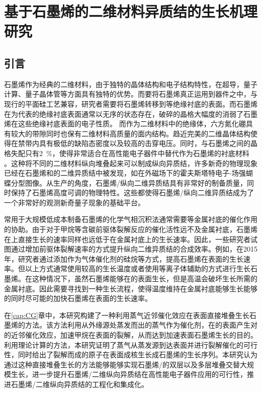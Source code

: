 \chapter{基于石墨烯的二维材料异质结的生长机理研究}
\section{引言}
石墨烯作为经典的二维材料，由于独特的晶体结构和电子结构特性，在超导，量子计算、量子晶体管等方面具有独特的优势。而要将石墨烯真正运用到器件之中，与现行的平面硅工艺兼容，研究者需要将石墨烯转移到等绝缘衬底的表面。而石墨烯在为代表的绝缘衬底表面通常以无序的状态存在，破碎的晶格大幅度的消弱了石墨烯在这些绝缘衬底表面的电子性质。
而作为二维材料中的绝缘体，六方氮化硼具有较大的带隙同时也保有二维材料高质量的面内结构。趋近完美的二维晶体结构使得在禁带内具有极低的缺陷态密度以及较高的击穿电压。同时，与石墨烯之间的晶格失配只有\SI{2}{\percent}，使得非常适合在高性能电子器件中替代作为石墨烯的衬底材料 。这种将不同的二维材料纵向堆叠起来可以制成纵向异质结，许多新奇的物理现象已经在石墨烯和的二维异质结中被发现，如在外磁场下的霍夫斯塔特电子-场强蝴蝶分型图像。从生产的角度，石墨烯/纵向二维异质结具有非常好的制备质量，同时保持了石墨烯高度可调的物理特性。这些都使得石墨烯/纵向二维异质结成为了一个非常好的观测新奇量子现象的基础平台。

常用于大规模低成本制备石墨烯的化学气相沉积法通常需要等金属衬底的催化作用的协助。由于对于甲烷等含碳前驱体裂解反应的催化活性远不及金属衬底，石墨烯在上直接生长的速率同样也远低于在金属衬底上的生长速率。因此，一些研究者试图通过增加前驱体裂解速率的方式提升纵向二维异质结的合成效率。例如，在2015年，研究者通过添加作为气体催化剂的硅烷等方式，提高石墨烯在表面的生长速率。但以上方式通常使用较高的生长温度或者使用等离子体辅助的方式进行生长石墨烯。在这种情况下，虽然石墨烯能够在的表面生长，但是高温会破坏生长所需的金属衬底。因此需要寻找到一种生长流程，使得温度维持在金属衬底能够生长能够的同时尽可能的加快石墨烯在表面的生长速率。

在\ref{cap:CG}章中，本研究构建了一种利用蒸气近邻催化效应在表面直接堆叠生长石墨烯的方法。该方法利用从外缘源处蒸发而出的蒸气作为催化剂，在的表面产生对的近邻催化效应，加速甲烷在表面的裂解，从而达到加速表面石墨烯生长的目的。利用理论计算的方法，本研究证明了蒸气从蒸发源到达表面并进行裂解催化的可行性，同时给出了裂解而成的原子在表面成核生长成石墨烯的生长序列。本研究认为通过这种直接堆叠生长的方法能够能够实现石墨烯/的双层以及多层堆叠交替大规模生长，进一步提升石墨烯/二维纵向异质结在高性能电子器件应用的可行性，推进石墨烯/二维纵向异质结的工程化和集成化。

